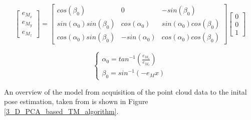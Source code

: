 \documentclass[conference]{IEEEtran}
\begin{document}
		\begin{equation}
			\label{eqn:estimated_axes}
			\begin{bmatrix} e_{M_x} \\ e_{M_y} \\ e_{M_z} \end{bmatrix}
			=
			\begin{bmatrix}
				cos(\beta_0)  & 0 & -sin(\beta_0) \\
				sin(\alpha_0)sin(\beta_0) & cos(\alpha_0) & sin(\alpha_0)cos(\beta_0) \\
				cos(\alpha_0)sin(\beta_0) & -sin(\alpha_0) & cos(\alpha_0)cos(\beta_0)
			\end{bmatrix}
			\begin{bmatrix} 0 \\ 0 \\ 1 \end{bmatrix}
		\end{equation}
		
		\begin{equation}
			\label{eqn:estimated_roll_pitch}
			\begin{cases}
				\alpha_0 = tan^{-1}(\frac{e_{M_x}}{e_{M_z}}) \\
				\beta_0 = sin^{-1}(-e_Mx)
			\end{cases} 
		\end{equation}
		
		
		An overview of the model from acquisition of the point cloud data to the inital pose estimation, taken from \cite{2017_pose_pca} is shown in Figure \ref{3_D_PCA_based_TM_algorithm}.
		
		
	\nocite{*}
	\printbibliography
	
\end{document}
